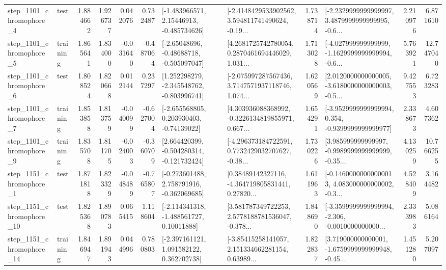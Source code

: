 \begin{tabular}{llrrrrllrlrr}
  step\_1101\_chromophore\_4 &      test &      1.884662 &    1.926737 &      0.042076 &  0.732487 &    [-1.483966571, 2.15446913, -0.485734626] &  [-2.4148429533902562, 3.594811741490624, -0.19... &       1.738714 &  [-2.2329999999999997, 3.4879999999999995, -0.6... &            2.210976 &          6.871610 \\
  step\_1101\_chromophore\_5 &  training &      1.865641 &    1.834000 &     -0.031640 & -0.487064 &    [-2.65048696, -0.48688718, -0.505097047] &  [4.2681725742780054, 0.2870461694446029, 1.031... &       1.713028 &  [-4.027999999999999, -1.1629999999999994, -0.6... &            5.763921 &         12.747040 \\
  step\_1101\_chromophore\_6 &      test &      1.808524 &    1.820668 &      0.012144 &  0.237297 &   [1.252298279, -2.345548762, -0.803996741] &  [-2.075997287567436, 3.7147571937118746, 1.074... &       1.620569 &  [2.0120000000000005, -3.6180000000000003, -0.5... &            9.427553 &          6.723283 \\
  step\_1101\_chromophore\_7 &  training &      1.853858 &    1.813759 &     -0.040099 & -0.627004 &    [-2.655568805, 0.203930403, -0.74139022] &  [4.303936088368992, -0.3226134819855971, 0.667... &       1.654291 &  [-3.9529999999999994, 0.354, -0.9399999999999977] &            2.338673 &          4.607362 \\
  step\_1101\_chromophore\_9 &  training &      1.835708 &    1.811705 &     -0.024003 & -0.360709 &   [2.664420399, -0.504280314, -0.121732424] &  [-4.296373184722591, 0.7732429032707627, -0.38... &       1.730226 &  [3.985999999999997, -0.9989999999999999, -0.35... &            4.130259 &         10.766255 \\
  step\_1151\_chromophore\_1 &      test &      1.871818 &    1.823329 &     -0.048489 & -0.765807 &   [-0.273601488, 2.758791916, -0.362069685] &  [0.38489142327116, -4.364719805831441, 0.27820... &       1.611963 &  [-0.14600000000000013, 4.083000000000002, -0.3... &            4.528409 &          3.164482 \\
 step\_1151\_chromophore\_10 &      test &      1.825368 &    1.890783 &      0.065415 &  1.118604 &    [-2.114341318, -1.488561727, 0.10011888] &  [3.581787349722253, 2.5778188781536047, -0.378... &       1.848690 &  [-3.3599999999999994, -2.306, -0.0010000000000... &            2.333983 &          5.086164 \\
 step\_1151\_chromophore\_14 &  training &      1.846947 &    1.891943 &      0.044996 &  0.780803 &    [-2.397161121, 1.091582122, 0.362702738] &  [-3.85415258141057, 2.151334662281154, 0.63989... &       1.822837 &  [3.719000000000001, -1.6759999999999948, -0.45... &            1.451280 &          5.207097 \\

\end{tabular}
